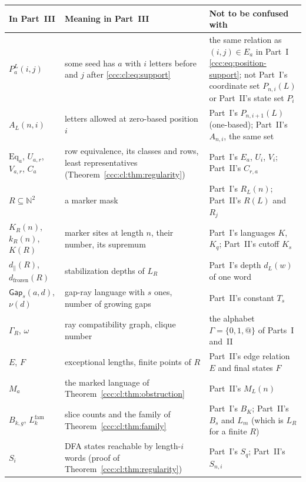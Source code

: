 \documentclass[11pt,letterpaper]{article}
\theoremstyle{definition}
\theoremstyle{remark}
\newcommand{\N}{\mathbb N}
\begin{document}
\begin{center}\small
\begin{tabular}{@{}>{\raggedright\arraybackslash}p{}>{\raggedright\arraybackslash}p{}>{\raggedright\arraybackslash}p{}@{}}
\toprule
\textbf{In Part~III} & \textbf{Meaning in Part~III} & \textbf{Not to be confused with}\\
\midrule
$P_a^L(i,j)$ & some seed has $a$ with $i$ letters before and $j$ after \eqref{ccc:cl:eq:support} & the same relation as $(i,j)\in E_a$ in Part~I \eqref{ccc:eq:position-support}; not Part~I's coordinate set $P_{n,i}(L)$ or Part~II's state set $P_i$\\[3pt]
$A_L(n,i)$ & letters allowed at zero-based position $i$ & Part~I's $P_{n,i+1}(L)$ (one-based); Part~II's $A_{n,i}$, the same set\\[3pt]
$\mathrm{Eq}_a$, $U_{a,r}$, $V_{a,r}$, $C_a$ & row equivalence, its classes and rows, least representatives (Theorem~\ref{ccc:cl:thm:regularity}) & Part~I's $E_a$, $U_i$, $V_i$; Part~II's $C_{r,a}$\\[3pt]
$R\subseteq\N^2$ & a marker mask & Part~I's $R_L(n)$; Part~II's $R(L)$ and $R_j$\\[3pt]
$K_R(n)$, $k_R(n)$, $K(R)$ & marker sites at length $n$, their number, its supremum & Part~I's languages $K$, $K_q$; Part~II's cutoff $K_s$\\[3pt]
$d_{\parallel}(R)$, $d_{\mathrm{frozen}}(R)$ & stabilization depths of $L_R$ & Part~I's depth $d_L(w)$ of one word\\[3pt]
$\mathsf{Gap}_s(a,d)$, $\nu(d)$ & gap-ray language with $s$ ones, number of growing gaps & Part~II's constant $T_s$\\[3pt]
$\Gamma_R$, $\omega$ & ray compatibility graph, clique number & the alphabet $\Gamma=\{0,1,@\}$ of Parts~I and~II\\[3pt]
$E$, $F$ & exceptional lengths, finite points of $R$ & Part~II's edge relation $E$ and final states $F$\\[3pt]
$M_a$ & the marked language of Theorem~\ref{ccc:cl:thm:obstruction} & Part~II's $M_L(n)$\\[3pt]
$B_{k,g}$, $L^{\mathrm{fam}}_k$ & slice counts and the family of Theorem~\ref{ccc:cl:thm:family} & Part~I's $B_K$; Part~II's $B_s$ and $L_m$ (which is $L_R$ for a finite $R$)\\[3pt]
$S_i$ & DFA states reachable by length-$i$ words (proof of Theorem~\ref{ccc:cl:thm:regularity}) & Part~I's $S_q$; Part~II's $S_{n,i}$\\
\bottomrule
\end{tabular}
\end{center}
\end{document}
